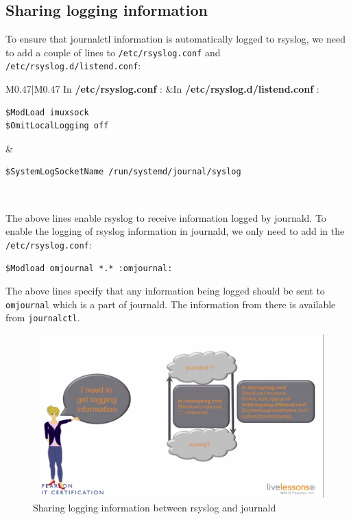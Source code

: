 \subsection{Sharing logging information}	
To ensure that journalctl information is automatically logged to rsyslog, we need to add a couple of lines to \verb|/etc/rsyslog.conf| and \verb|/etc/rsyslog.d/listend.conf|:

\noindent
\begin{tabular}{M{0.47}|M{0.47}}
	\toprule
	In \textbf{/etc/rsyslog.conf} : &In \textbf{/etc/rsyslog.d/listend.conf} : \\
	\midrule
	\begin{minipage}{\linewidth}
		\begin{verbatim}
$ModLoad imuxsock
$OmitLocalLogging off
		\end{verbatim}
		\vspace{-10pt}
	\end{minipage}
	
	&\begin{minipage}{\linewidth}
		\begin{verbatim}
$SystemLogSocketName /run/systemd/journal/syslog
		\end{verbatim}
		\vspace{-10pt}
	\end{minipage}
	\\
	\bottomrule
\end{tabular}

\noindent
The above lines enable rsyslog to receive information logged by journald. To enable the logging of rsyslog information in journald, we only need to add in the \verb|/etc/rsyslog.conf|:

\vspace{-15pt}
\begin{verbatim}
$Modload omjournal *.* :omjournal:
\end{verbatim}
\vspace{-10pt}

\noindent
The above lines specify that any information being logged should be sent to \verb|omjournal| which is a part of journald. The information from there is available from \verb|journalctl|.

\begin{figure}[H]
	\centering
	\includegraphics[width=0.9\linewidth]{Mod2/chapters/2.14.b}
	\caption{Sharing logging information between rsyslog and journald}
	\label{fig:2 Sharing logging information}
\end{figure}

